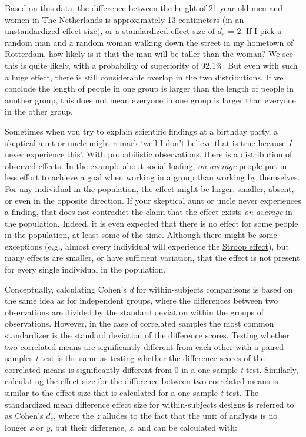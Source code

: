 \documentclass[
  oneside]{book}
\begin{document}
Based on \href{http://www.nature.com/pr/journal/v73/n3/full/pr2012189a.html}{this data}, the difference between the height of 21-year old men and women in The Netherlands is approximately 13 centimeters (in an unstandardized effect size), or a standardized effect size of \(d_s\) = 2. If I pick a random man and a random woman walking down the street in my hometown of Rotterdam, how likely is it that the man will be taller than the woman? We see this is quite likely, with a probability of superiority of 92.1\%. But even with such a huge effect, there is still considerable overlap in the two distributions. If we conclude the length of people in one group is larger than the length of people in another group, this does not mean everyone in one group is larger than everyone in the other group.

Sometimes when you try to explain scientific findings at a birthday party, a skeptical aunt or uncle might remark `well I don't believe that is true because \emph{I} never experience this'. With probabilistic observations, there is a distribution of observed effects. In the example about social loafing, \emph{on average} people put in less effort to achieve a goal when working in a group than working by themselves. For any individual in the population, the effect might be larger, smaller, absent, or even in the opposite direction. If your skeptical aunt or uncle never experiences a finding, that does not contradict the claim that the effect exists \emph{on average} in the population. Indeed, it is even expected that there is no effect for some people in the population, at least some of the time. Although there might be some exceptions (e.g., almost every individual will experience the \href{https://en.wikipedia.org/wiki/Stroop_effect}{Stroop effect}), but many effects are smaller, or have sufficient variation, that the effect is not present for every single individual in the population.

Conceptually, calculating Cohen's \emph{d} for within-subjects comparisons is based on the same idea as for independent groups, where the differences between two observations are divided by the standard deviation within the groups of observations. However, in the case of correlated samples the most common standardizer is the standard deviation of the difference scores. Testing whether two correlated means are significantly different from each other with a paired samples \emph{t}-test is the same as testing whether the difference scores of the correlated means is significantly different from 0 in a one-sample \emph{t}-test. Similarly, calculating the effect size for the difference between two correlated means is similar to the effect size that is calculated for a one sample \emph{t}-test. The standardized mean difference effect size for within-subjects designs is referred to as Cohen's \(d_z\), where the \emph{z} alludes to the fact that the unit of analysis is no longer \emph{x} or \emph{y}, but their difference, \emph{z}, and can be calculated with:
\end{document}
